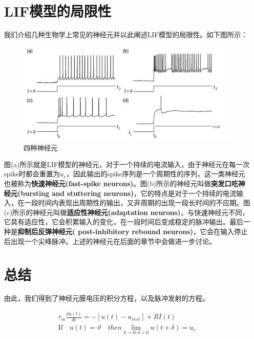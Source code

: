 \documentclass[12pt, a4paper, oneside]{ctexbook}
\begin{document}
\section{LIF模型的局限性}

我们介绍几种生物学上常见的神经元并以此阐述LIF模型的局限性。如下图所示：

\begin{figure}[H]
    \centering
    \includegraphics[width=1\textwidth]{四种神经元.png}
    \caption{四种神经元}
\end{figure}

图(a)所示就是LIF模型的神经元，对于一个持续的电流输入，由于神经元在每一次spike时都会重置为$u_{r}$，因此输出的spike序列是一个周期性的序列，这一类神经元也被称为\textbf{快速神经元(fast-spike neurons)}。图(b)所示的神经元叫做\textbf{突发口吃神经元(bursting and stuttering neurons)}，它的特点是对于一个持续的电流输入，在一段时间内表现出周期性的输出，又非周期的出现一段长时间的不应期。图(c)所示的神经元叫做\textbf{适应性神经元(adaptation neurons)}，与快速神经元不同，它具有适应性，它会积累输入的变化，在一段时间后变成稳定的脉冲输出。最后一种是\textbf{抑制后反弹神经元( post-inhibitory rebound neurons)}，它会在输入停止后出现一个尖峰脉冲。上述的神经元在后面的章节中会做进一步讨论。

\section{总结}
由此，我们得到了神经元膜电压的积分方程，以及脉冲发射的方程。

\begin{equation}
    \begin{aligned}
        \tau _m\frac{du(t)}{dt}= -[u(t)-u_{rest}] + RI(t)\\
        \text{If}\quad u(t)=\vartheta \quad then \lim_{\delta \to 0;\delta>0} u(t+\delta)=u_r 
    \end{aligned}
\end{equation}
\end{document}
